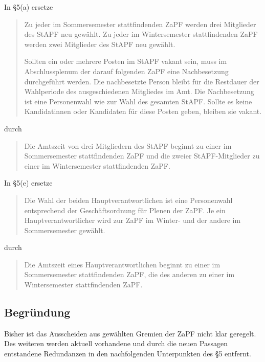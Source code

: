 \documentclass[draft,10pt,oneside]{scrartcl}
\begin{document}
In §5(a) ersetze
\begin{quote}
	Zu jeder im Sommersemester stattfindenden ZaPF werden drei Mitglieder des StAPF
	neu gewählt.
	Zu jeder im Wintersemester stattfindenden ZaPF werden zwei Mitglieder des StAPF
	neu gewählt.

	Sollten ein oder mehrere Posten im StAPF vakant sein, muss im Abschlussplenum der
	darauf folgenden ZaPF eine Nachbesetzung durchgeführt werden.
	Die nachbesetzte Person bleibt für die Restdauer der Wahlperiode des
	ausgeschiedenen Mitgliedes im Amt.
	Die Nachbesetzung ist eine Personenwahl wie zur Wahl des gesamten StAPF.
	Sollte es keine Kandidatinnen oder Kandidaten für diese Posten geben, bleiben
	sie vakant.
\end{quote}
durch
\begin{quote}
	Die Amtszeit von drei Mitgliedern des StAPF beginnt zu einer im Sommersemester
	stattfindenden ZaPF und die zweier StAPF-Mitglieder zu einer im Wintersemester
	stattfindenden ZaPF.
\end{quote}
\vspace{0.25cm}

In §5(e) ersetze
\begin{quote}
	Die Wahl der beiden Hauptverantwortlichen ist eine Personenwahl entsprechend der
	Geschäftsordnung für Plenen der ZaPF.  Je ein Hauptverantwortlicher wird zur
	ZaPF im Winter- und der andere im Sommersemester gewählt.
\end{quote}
durch
\begin{quote}
	Die Amtszeit eines Hauptverantwortlichen beginnt zu einer im Sommersemester
	stattfindenden ZaPF, die des anderen zu einer im Wintersemester stattfindenden
	ZaPF.
\end{quote}

\subsection*{Begründung}

Bisher ist das Ausscheiden aus gewählten Gremien der ZaPF nicht klar geregelt.
Des weiteren werden aktuell vorhandene und durch die neuen Passagen entstandene
Redundanzen in den nachfolgenden Unterpunkten des §5 entfernt.
\end{document}
